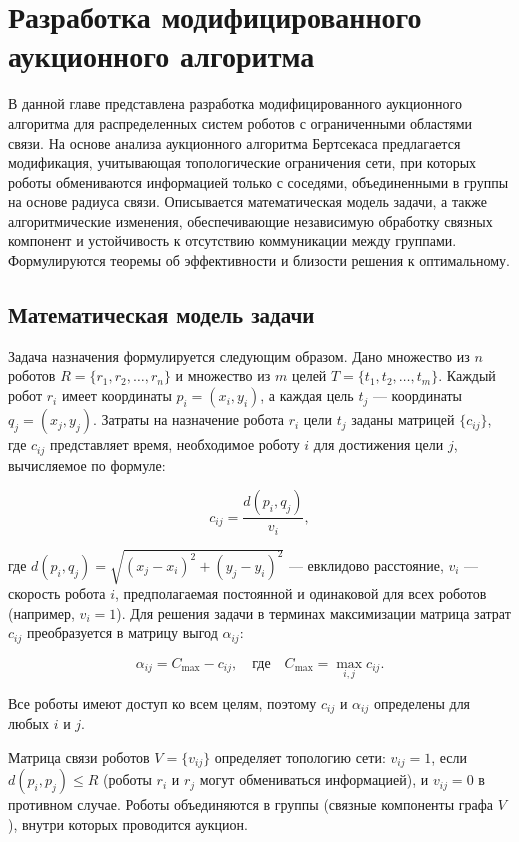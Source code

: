 \chapter{Разработка модифицированного аукционного алгоритма}
\label{ch2}

В данной главе представлена разработка модифицированного аукционного алгоритма для распределенных систем роботов с ограниченными областями связи. На основе анализа аукционного алгоритма Бертсекаса \cite{bertsekas1990} предлагается модификация, учитывающая топологические ограничения сети, при которых роботы обмениваются информацией только с соседями, объединенными в группы на основе радиуса связи. Описывается математическая модель задачи, а также алгоритмические изменения, обеспечивающие независимую обработку связных компонент и устойчивость к отсутствию коммуникации между группами. Формулируются теоремы об эффективности и близости решения к оптимальному.

\section{Математическая модель задачи}

Задача назначения формулируется следующим образом. Дано множество из \( n \) роботов \( R = \{r_1, r_2, \ldots, r_n\} \) и множество из \( m \) целей \( T = \{t_1, t_2, \ldots, t_m\} \). Каждый робот \( r_i \) имеет координаты \( p_i = (x_i, y_i) \), а каждая цель \( t_j \) --- координаты \( q_j = (x_j, y_j) \). Затраты на назначение робота \( r_i \) цели \( t_j \) заданы матрицей \( \{c_{ij}\} \), где \( c_{ij} \) представляет время, необходимое роботу \( i \) для достижения цели \( j \), вычисляемое по формуле:

\[
c_{ij} = \frac{d(p_i, q_j)}{v_i},
\]

где \( d(p_i, q_j) = \sqrt{(x_j - x_i)^2 + (y_j - y_i)^2} \) --- евклидово расстояние, \( v_i \) --- скорость робота \( i \), предполагаемая постоянной и одинаковой для всех роботов (например, \( v_i = 1 \)). Для решения задачи в терминах максимизации матрица затрат \( c_{ij} \) преобразуется в матрицу выгод \( \alpha_{ij} \):

\[
\alpha_{ij} = C_{\text{max}} - c_{ij}, \quad \text{где} \quad C_{\text{max}} = \max_{i,j} c_{ij}.
\]

Все роботы имеют доступ ко всем целям, поэтому \( c_{ij} \) и \( \alpha_{ij} \) определены для любых \( i \) и \( j \).

Матрица связи роботов \( V = \{v_{ij}\} \) определяет топологию сети: \( v_{ij} = 1 \), если \( d(p_i, p_j) \leq R \) (роботы \( r_i \) и \( r_j \) могут обмениваться информацией), и \( v_{ij} = 0 \) в противном случае. Роботы объединяются в группы (связные компоненты графа \( V \)), внутри которых проводится аукцион.

